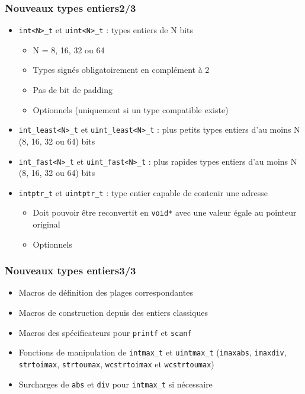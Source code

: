 \documentclass[C++.tex]{subfiles}
\begin{document}
\begin{frame}[fragile]
	\frametitle{Nouveaux types entiers\titlehfill{}2/3}
	\begin{itemize}
		\item \lstinline|int<N>_t| et \lstinline|uint<N>_t| : types entiers de N bits
		\begin{itemize}
			\item N = 8, 16, 32 ou 64
			\item Types signés obligatoirement en complément à 2


			\item Pas de bit de padding
			\item Optionnels (uniquement si un type compatible existe)
		\end{itemize}
		\item \lstinline|int_least<N>_t| et \lstinline|uint_least<N>_t| : plus petits types entiers d'au moins N (8, 16, 32 ou 64) bits
		\item \lstinline|int_fast<N>_t| et \lstinline|uint_fast<N>_t| : plus rapides types entiers d'au moins N (8, 16, 32 ou 64) bits
		\item \lstinline|intptr_t| et \lstinline|uintptr_t| : type entier capable de contenir une adresse
		\begin{itemize}
			\item Doit pouvoir être reconvertit en \lstinline|void*| avec une valeur égale au pointeur original
			\item Optionnels
		\end{itemize}
	\end{itemize}
\end{frame}

\begin{frame}[fragile]
	\frametitle{Nouveaux types entiers\titlehfill{}3/3}
	\begin{itemize}
		\item Macros de définition des plages correspondantes
		\item Macros de construction depuis des entiers \og classiques\fg{}
		\item Macros des spécificateurs pour \lstinline|printf| et \lstinline|scanf|
		\item Fonctions de manipulation de \lstinline|intmax_t| et \lstinline|uintmax_t| (\lstinline|imaxabs|, \lstinline|imaxdiv|, \lstinline|strtoimax|, \lstinline|strtoumax|, \lstinline|wcstrtoimax| et \lstinline|wcstrtoumax|)
		\item Surcharges de \lstinline|abs| et \lstinline|div| pour \lstinline|intmax_t| si nécessaire

	\end{itemize}
\end{frame}
\end{document}

